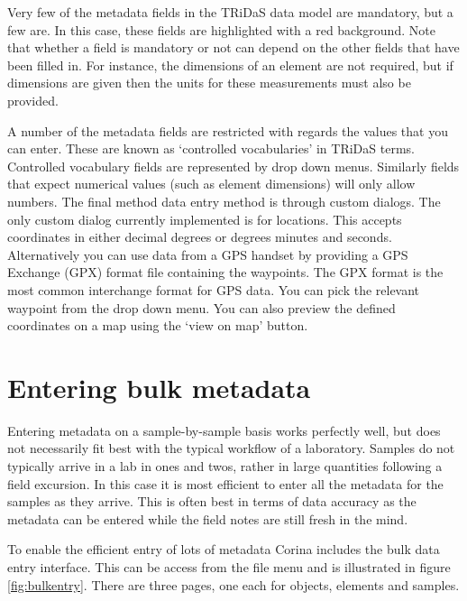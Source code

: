Very few of the metadata fields in the TRiDaS data model are mandatory, but a few are.  In this case, these fields are highlighted with a red background.  Note that whether a field is mandatory or not can depend on the other fields that have been filled in.  For instance, the dimensions of an element are not required, but if dimensions are given then the units for these measurements must also be provided.

A number of the metadata fields are restricted with regards the values that you can enter.  These are known as `controlled vocabularies' in TRiDaS terms.  Controlled vocabulary fields are represented by drop down menus.  Similarly fields that expect numerical values (such as element dimensions) will only allow numbers.  The final method data entry method is through custom dialogs.  The only custom dialog currently implemented is for locations.  This accepts coordinates in either decimal degrees or degrees minutes and seconds.  Alternatively you can use data from a GPS handset by providing a GPS Exchange (GPX) format file containing the waypoints. The GPX format is the most common interchange format for GPS data. You can pick the relevant waypoint from the drop down menu.  You can also preview the defined coordinates on a map using the `view on map' button. 



\section{Entering bulk metadata}

Entering metadata on a sample-by-sample basis works perfectly well, but does not necessarily fit best with the typical workflow of a laboratory.  Samples do not typically arrive in a lab in ones and twos, rather in large quantities following a field excursion.  In this case it is most efficient to enter all the metadata for the samples as they arrive.  This is often best in terms of data accuracy as the metadata can be entered while the field notes are still fresh in the mind.

To enable the efficient entry of lots of metadata Corina includes the bulk data entry interface.  This can be access from the file menu and is illustrated in figure \ref{fig:bulkentry}.  There are three pages, one each for objects, elements and samples.

